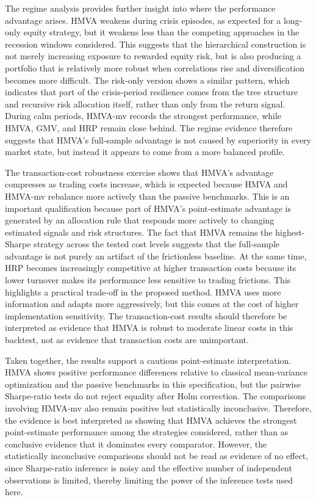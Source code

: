 \documentclass[12pt]{article}
\begin{document}
The regime analysis provides further insight into where the performance advantage arises. HMVA weakens during crisis episodes, as expected for a long-only equity strategy, but it weakens less than the competing approaches in the recession windows considered. This suggests that the hierarchical construction is not merely increasing exposure to rewarded equity risk, but is also producing a portfolio that is relatively more robust when correlations rise and diversification becomes more difficult. The risk-only version shows a similar pattern, which indicates that part of the crisis-period resilience comes from the tree structure and recursive risk allocation itself, rather than only from the return signal. During calm periods, HMVA-mv records the strongest performance, while HMVA, GMV, and HRP remain close behind. The regime evidence therefore suggests that HMVA's full-sample advantage is not caused by superiority in every market state, but instead it appears to come from a more balanced profile.

The transaction-cost robustness exercise shows that HMVA's advantage compresses as trading costs increase, which is expected because HMVA and HMVA-mv rebalance more actively than the passive benchmarks. This is an important qualification because part of HMVA's point-estimate advantage is generated by an allocation rule that responds more actively to changing estimated signals and risk structures. The fact that HMVA remains the highest-Sharpe strategy across the tested cost levels suggests that the full-sample advantage is not purely an artifact of the frictionless baseline. At the same time, HRP becomes increasingly competitive at higher transaction costs because its lower turnover makes its performance less sensitive to trading frictions. This highlights a practical trade-off in the proposed method. HMVA uses more information and adapts more aggressively, but this comes at the cost of higher implementation sensitivity. The transaction-cost results should therefore be interpreted as evidence that HMVA is robust to moderate linear costs in this backtest, not as evidence that transaction costs are unimportant.

Taken together, the results support a cautious point-estimate interpretation. HMVA shows positive performance differences relative to classical mean-variance optimization and the passive benchmarks in this specification, but the pairwise Sharpe-ratio tests do not reject equality after Holm correction. The comparisons involving HMVA-mv also remain positive but statistically inconclusive. Therefore, the evidence is best interpreted as showing that HMVA achieves the strongest point-estimate performance among the strategies considered, rather than as conclusive evidence that it dominates every comparator. However, the statistically inconclusive comparisons should not be read as evidence of no effect, since Sharpe-ratio inference is noisy and the effective number of independent observations is limited, thereby limiting the power of the inference tests used here.
\end{document}
